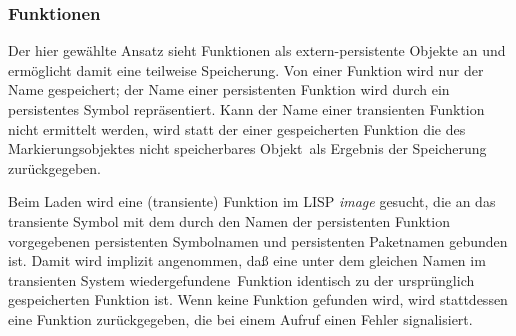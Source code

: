 \subsubsection{Funktionen}
%
Der hier gew\"{a}hlte Ansatz sieht Funktionen als extern-persistente
Objekte an und erm\"{o}glicht damit eine teilweise Speicherung.  Von
einer Funktion wird nur der Name gespeichert; der Name einer
persistenten Funktion wird durch ein persistentes Symbol
repr\"{a}sentiert. Kann der Name einer transienten Funktion nicht
ermittelt werden, wird statt der \sobjid\/ einer gespeicherten Funktion
die \sobjid\/ des Markierungsobjektes \rglq{}nicht speicherbares
Objekt\rgrq\ als Ergebnis der Speicherung zur\"{u}ckgegeben.
%
\par{}Beim Laden wird eine (transiente) Funktion im LISP
{\em image\/} gesucht, die an das transiente Symbol mit dem durch den
Namen der persistenten Funktion vorgegebenen persistenten Symbolnamen
und persistenten Paketnamen gebunden ist.  Damit wird implizit
angenommen, da\ss{} eine unter dem gleichen Namen im transienten System
\rglq{}wiedergefundene\rgrq\ Funktion identisch zu der urspr\"{u}nglich
gespeicherten Funktion ist. Wenn keine Funktion
gefunden wird, wird stattdessen eine Funktion zur\"{u}ckgegeben, die bei
einem Aufruf einen Fehler signalisiert.
%
%
%
